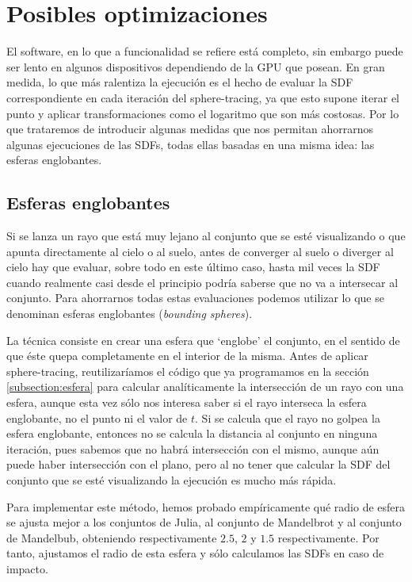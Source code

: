 \section{Posibles optimizaciones}

El software, en lo que a funcionalidad se refiere está completo, sin embargo puede ser lento en algunos dispositivos dependiendo de la GPU que posean. En gran medida, lo que más ralentiza la ejecución es el hecho de evaluar la SDF correspondiente en cada iteración del sphere-tracing, ya que esto supone iterar el punto y aplicar transformaciones como el logaritmo que son más costosas. Por lo que trataremos de introducir algunas medidas que nos permitan ahorrarnos algunas ejecuciones de las SDFs, todas ellas basadas en una misma idea: las esferas englobantes.

\subsection{Esferas englobantes}
 
Si se lanza un rayo que está muy lejano al conjunto que se esté visualizando o que apunta directamente al cielo o al suelo, antes de converger al suelo o diverger al cielo hay que evaluar, sobre todo en este último caso, hasta mil veces la SDF cuando realmente casi desde el principio podría saberse que no va a intersecar al conjunto. Para ahorrarnos todas estas evaluaciones podemos utilizar lo que se denominan esferas englobantes (\textit{bounding spheres}).

La técnica consiste en crear una esfera que `englobe' el conjunto, en el sentido de que éste quepa completamente en el interior de la misma. Antes de aplicar sphere-tracing, reutilizaríamos el código que ya programamos en la sección \ref{subsection:esfera} para calcular analíticamente la intersección de un rayo con una esfera, aunque esta vez sólo nos interesa saber si el rayo interseca la esfera englobante, no el punto ni el valor de $t$. Si se calcula que el rayo no golpea la esfera englobante, entonces no se calcula la distancia al conjunto en ninguna iteración, pues sabemos que no habrá intersección con el mismo, aunque aún puede haber intersección con el plano, pero al no tener que calcular la SDF del conjunto que se esté visualizando la ejecución es mucho más rápida.

Para implementar este método, hemos probado empíricamente qué radio de esfera se ajusta mejor a los conjuntos de Julia, al conjunto de Mandelbrot y al conjunto de Mandelbub, obteniendo respectivamente $2.5$, $2$ y $1.5$ respectivamente. Por tanto, ajustamos el radio de esta esfera y sólo calculamos las SDFs en caso de impacto.

